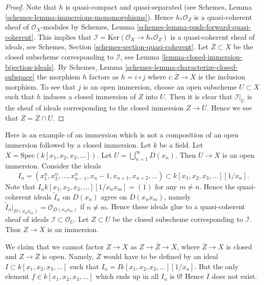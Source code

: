 \begin{proof}
Note that $h$ is quasi-compact and quasi-separated (see
Schemes, Lemma \ref{schemes-lemma-immersions-monomorphisms}).
Hence $h_*\mathcal{O}_Z$ is a quasi-coherent sheaf of $\mathcal{O}_X$-modules
by Schemes, Lemma \ref{schemes-lemma-push-forward-quasi-coherent}.
This implies that
$\mathcal{I} = \text{Ker}(\mathcal{O}_X \to h_*\mathcal{O}_Z)$
is a quasi-coherent sheaf of ideals, see
Schemes, Section \ref{schemes-section-quasi-coherent}.
Let $\overline{Z} \subset X$ be the closed subscheme corresponding
to $\mathcal{I}$, see Lemma \ref{lemma-closed-immersion-bijection-ideals}.
By Schemes, Lemma \ref{schemes-lemma-characterize-closed-subspace}
the morphism $h$ factors as
$h = i \circ j$ where $i : \overline{Z} \to X$ is the inclusion morphism.
To see that $j$ is an open immersion, choose an open subscheme
$U \subset X$ such that $h$ induces a closed immersion of $Z$
into $U$. Then it is clear that $\mathcal{I}|_U$ is the
sheaf of ideals corresponding to the closed immersion $Z \to U$.
Hence we see that $Z = \overline{Z} \cap U$.
\end{proof}

\begin{example}
\label{example-thibaut}
Here is an example of an immersion which is not a composition of an
open immersion followed by a closed immersion.
Let $k$ be a field.
Let $X = \text{Spec}(k[x_1, x_2, x_3, \ldots])$.
Let $U = \bigcup_{n = 1}^{\infty} D(x_n)$.
Then $U \to X$ is an open immersion.
Consider the ideals
$$
I_n =
(x_1^n, x_2^n, \ldots, x_{n - 1}^n, x_n - 1, x_{n + 1}, x_{n + 2}, \ldots)
\subset
k[x_1, x_2, x_3, \ldots][1/x_n].
$$
Note that $I_n k[x_1, x_2, x_3, \ldots][1/x_nx_m] = (1)$
for any $m \not = n$. Hence the quasi-coherent ideals
$\widetilde I_n$ on $D(x_n)$ agree on $D(x_nx_m)$, namely
$\widetilde I_n|_{D(x_nx_m)} = \mathcal{O}_{D(x_n x_m)}$ if
$n \not = m$. Hence these ideals glue to a quasi-coherent sheaf of ideals
$\mathcal{I} \subset \mathcal{O}_U$.
Let $Z \subset U$ be the closed subscheme corresponding to
$\mathcal{I}$. Thus $Z \to X$ is an immersion.

\medskip\noindent
We claim that we cannot factor $Z \to X$ as
$Z \to \overline{Z} \to X$, where $\overline{Z} \to X$ is closed
and $Z \to \overline{Z}$ is open. Namely, $\overline{Z}$ would
have to be defined by an ideal $I \subset k[x_1, x_2, x_3, \ldots]$
such that $I_n = I k[x_1, x_2, x_3, \ldots][1/x_n]$.
But the only element $f \in k[x_1, x_2, x_3, \ldots]$
which ends up in all $I_n$ is $0$! Hence $I$ does not exist.
\end{example}








